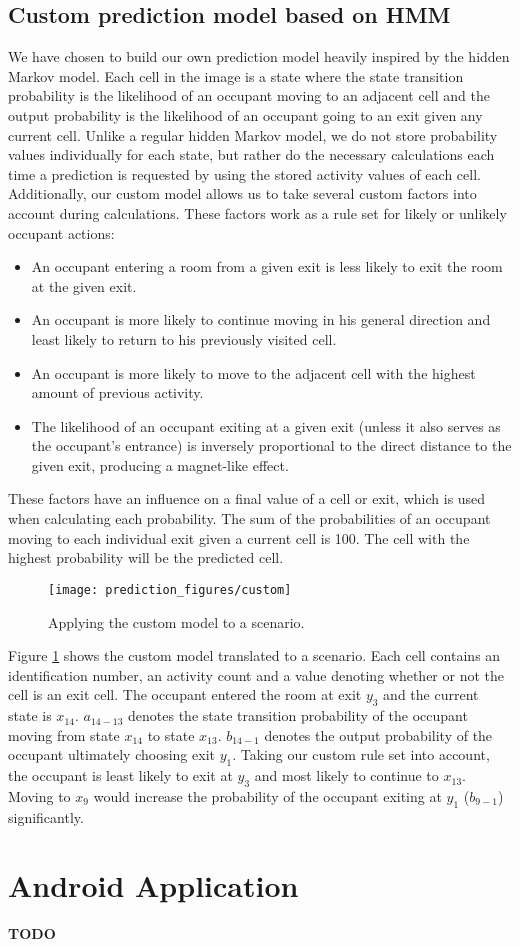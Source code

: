 \subsection{Custom prediction model based on HMM}
\label{ssub:designcustomprediction}
We have chosen to build our own prediction model heavily inspired by the hidden Markov model. Each cell in the image is a state where the state transition probability is the likelihood of an occupant moving to an adjacent cell and the output probability is the likelihood of an occupant going to an exit given any current cell. Unlike a regular hidden Markov model, we do not store probability values individually for each state, but rather do the necessary calculations each time a prediction is requested by using the stored activity values of each cell. Additionally, our custom model allows us to take several custom factors into account during calculations. These factors work as a rule set for likely or unlikely occupant actions:
\begin{itemize}
\item An occupant entering a room from a given exit is less likely to exit the room at the given exit.
\item An occupant is more likely to continue moving in his general direction and least likely to return to his previously visited cell.
\item An occupant is more likely to move to the adjacent cell with the highest amount of previous activity.
\item The likelihood of an occupant exiting at a given exit (unless it also serves as the occupant's entrance) is inversely proportional to the direct distance to the given exit, producing a magnet-like effect. 
\end{itemize}
These factors have an influence on a final value of a cell or exit, which is used when calculating each probability. The sum of the probabilities of an occupant moving to each individual exit given a current cell is 100. The cell with the highest probability will be the predicted cell. \\
\begin{figure}
\centering
\texttt{[image: prediction\_figures/custom]}
\caption{Applying the custom model to a scenario.}
\label{fig:custom_model}
\end{figure}
Figure \ref{fig:custom_model} shows the custom model translated to a scenario. Each cell contains an identification number, an activity count and a value denoting whether or not the cell is an exit cell. The occupant entered the room at exit \(y_3\) and the current state is \(x_{14}\). \(a_{14-13}\) denotes the state transition probability of the occupant moving from state \(x_{14}\) to state \(x_{13}\). \(b_{14-1}\) denotes the output probability of the occupant ultimately choosing exit \(y_{1}\). Taking our custom rule set into account, the occupant is least likely to exit at \(y_3\) and most likely to continue to \(x_{13}\). Moving to \(x_9\) would increase the probability of the occupant exiting at \(y_{1}\) (\(b_{9-1}\)) significantly.

\section{Android Application}
{\color[rgb]{1,0,0} \textbf{\large TODO}}